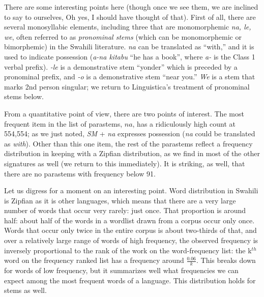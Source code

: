 \documentclass[output=paper,colorlinks,citecolor=brown]{langscibook}
\begin{document}
 


There are some interesting points here (though once we see them, we are inclined to say to ourselves, Oh yes, I should have thought of that). First of all, there are several monosyllabic elements, including three that are monomorphemic \textit{na, le, we}, often referred to as \textit{pronominal stems} (which can be monomorphemic or bimorphemic) in the Swahili literature. \textit{na} can be translated as ``with,'' and it is used to indicate possession (\textit{a-na kitabu} ``he has a book'', where \textit{a-} is the Class 1 verbal prefix). \textit{-le} is a demonstrative stem ``yonder'' which is preceded by a pronominal prefix,  and \textit{-o} is a demonstrative stem ``near you.'' \textit{We} is a stem that marks 2nd person singular; we return to Linguistica's treatment of pronominal stems below. 

From a quantitative point of view, there are two points of interest. The most frequent item in the list of parastems, $na$, has a ridiculously high count at 554,554; as we just noted, \textit{SM} + \textit{na} expresses possession (\textit{na} could be translated as \textit{with}). Other than this one item, the rest of the parastems reflect a frequency distribution in keeping with a Zipfian distribution, as we find in most of the other signatures as well (we return to this immediately). It is striking, as well, that there are no parastems with frequency below 91. 

Let us digress for a moment on an interesting point. Word distribution in Swahili is Zipfian as it is other languages, which means that there are a very large number of words that occur very rarely: just once. That proportion is around half: about half of the words in a wordlist drawn from a corpus occur only once. Words that occur only twice in the entire corpus is about two-thirds of that, and over a relatively large range of words of high frequency, the observed frequency is inversely proportional to the rank of the work on the word-frequency list: the k$^{th}$ word on the frequency ranked list has a frequency around $\frac{0.06}{k}$. This breaks down for words of low frequency, but it summarizes well what frequencies we can expect among the most frequent words of a language. This distribution holds for stems as well. 
\end{document}
